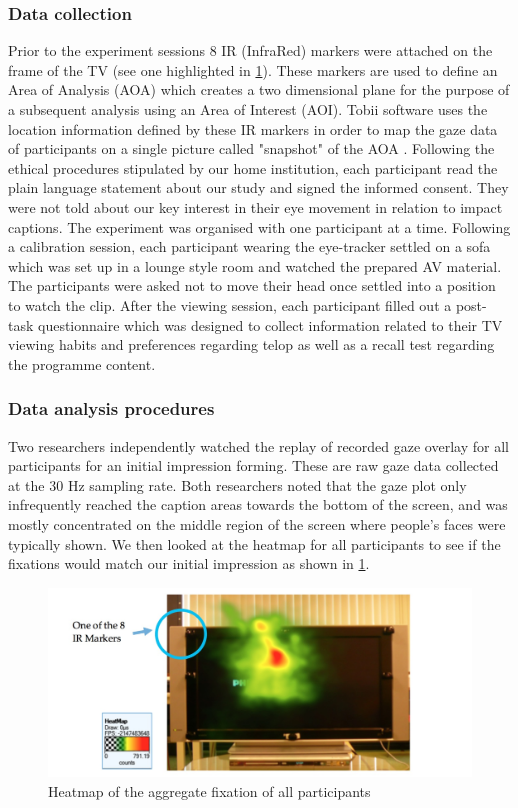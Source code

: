 \documentclass[output=paper]{langsci/langscibook}
\begin{document}
\subsubsection{Data collection}

Prior to the experiment sessions 8 IR (InfraRed) markers were attached on the frame of the TV (see one highlighted in \ref{ohagan:fig:2}). These markers are used to define an Area of Analysis (AOA) which creates a two dimensional plane for the purpose of a subsequent analysis using an Area of Interest (AOI).  Tobii software uses the location information defined by these IR markers in order to map the gaze data of participants on a single picture called "snapshot" of the AOA \citep{Tobii2012}. Following the ethical procedures stipulated by our home institution, each participant read the plain language statement about our study and signed the informed consent. They were not told about our key interest in their eye movement in relation to impact captions. The experiment was organised with one participant at a time. Following a calibration session, each participant wearing the eye-tracker settled on a sofa which was set up in a lounge style room and watched the prepared AV material.  The participants were asked not to move their head once settled into a position to watch the clip. After the viewing session, each participant filled out a post-task questionnaire which was designed to collect information related to their TV viewing habits and preferences regarding telop as well as a recall test regarding the programme content.  

\subsubsection{Data analysis procedures}

Two researchers independently watched the replay of recorded gaze overlay for all participants for an initial impression forming.  These are raw gaze data collected at the 30 Hz sampling rate.  Both researchers noted that the gaze plot only infrequently reached the caption areas towards the bottom of the screen, and was mostly concentrated on the middle region of the screen where people's faces were typically shown. We then looked at the heatmap for all participants to see if the fixations would match our initial impression as shown in \ref{ohagan:fig:2}. 

\begin{figure}
 \includegraphics[width=\textwidth]{figures/OHagan2.png}
 \caption{Heatmap of the aggregate fixation of all participants}
 \label{ohagan:fig:2}
\end{figure}
\end{document}
